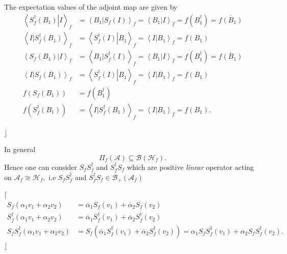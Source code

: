 \documentclass[aps,preprint]{revtex4}%
\begin{document}
The expectation values of the adjoint map are given by
\begin{align}
\left\langle \left.  S_{f}^{\dagger}\left(  B_{1}\right)  \right\vert
I\right\rangle _{f}  &  =\left\langle \left.  B_{1}\right\vert S_{f}\left(
I\right)  \right\rangle _{f}=\left\langle \left.  B_{1}\right\vert
I\right\rangle _{f}=f\left(  B_{1}^{\dagger}\right)  =\overline{f\left(
B_{1}\right)  }\\
\left\langle \left.  I\right\vert S_{f}^{\dagger}\left(  B_{1}\right)
\right\rangle _{f}  &  =\left\langle \left.  S_{f}^{\dagger}\left(  I\right)
\right\vert B_{1}\right\rangle _{f}=\left\langle \left.  I\right\vert
B_{1}\right\rangle _{f}=f\left(  B_{1}\right) \\
\left\langle \left.  S_{f}\left(  B_{1}\right)  \right\vert I\right\rangle
_{f}  &  =\left\langle \left.  B_{1}\right\vert S_{f}^{\dagger}\left(
I\right)  \right\rangle _{f}=\left\langle \left.  B_{1}\right\vert
I\right\rangle _{f}=f\left(  B_{1}^{\dagger}\right)  =\overline{f\left(
B_{1}\right)  }\\
\left\langle \left.  I\right\vert S_{f}\left(  B_{1}\right)  \right\rangle
_{f}  &  =\left\langle \left.  S_{f}^{\dagger}\left(  I\right)  \right\vert
B_{1}\right\rangle _{f}=\left\langle \left.  I\right\vert B_{1}\right\rangle
_{f}=f\left(  B_{1}\right) \\
f\left(  S_{f}\left(  B_{1}\right)  \right)   &  =f\left(  B_{1}^{\dagger
}\right) \\
f\left(  S_{f}^{\dagger}\left(  B_{1}\right)  \right)   &  =\left\langle
\left.  I\right\vert S_{f}^{\dagger}\left(  B_{1}\right)  \right\rangle
_{f}=\left\langle \left.  I\right\vert B_{1}\right\rangle _{f}=f\left(
B_{1}\right)  .
\end{align}


$\rfloor$

In general
\begin{equation}
\Pi_{f}\left(  \mathcal{A}\right)  \subseteq\mathcal{B}\left(  \mathcal{H}%
_{f}\right)  .
\end{equation}
Hence one can consider $S_{f}S_{f}^{\dagger}$ and $S_{f}^{\dagger}S_{f}$ which
are positive \emph{linear }operator acting on $\mathcal{A}_{f}\cong%
\mathcal{H}_{f},$ i.e $S_{f}S_{f}^{\dagger}$ and $S_{f}^{\dagger}S_{f}%
\in\mathcal{B}_{+}\left(  \mathcal{A}_{f}\right)  $

$\lceil$%
\begin{align}
S_{f}\left(  \alpha_{1}v_{1}+\alpha_{2}v_{2}\right)   &  =\overline{\alpha
}_{1}S_{f}\left(  v_{1}\right)  +\overline{\alpha}_{2}S_{f}\left(
v_{2}\right) \\
S_{f}^{\dagger}\left(  \alpha_{1}v_{1}+\alpha_{2}v_{2}\right)   &
=\overline{\alpha}_{1}S_{f}^{\dagger}\left(  v_{1}\right)  +\overline{\alpha
}_{2}S_{f}^{\dagger}\left(  v_{2}\right) \\
S_{f}S_{f}^{\dagger}\left(  \alpha_{1}v_{1}+\alpha_{2}v_{2}\right)   &
=S_{f}\left(  \overline{\alpha}_{1}S_{f}^{\dagger}\left(  v_{1}\right)
+\overline{\alpha}_{2}S_{f}^{\dagger}\left(  v_{2}\right)  \right)
=\alpha_{1}S_{f}S_{f}^{\dagger}\left(  v_{1}\right)  +\alpha_{2}S_{f}%
S_{f}^{\dagger}\left(  v_{2}\right)  .
\end{align}
$\rfloor$
\end{document}
